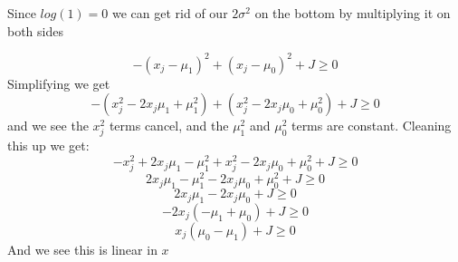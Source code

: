\documentclass[11pt,a4paper]{article}
\begin{document}
\begin{enumerate}
			  Since $log(1)=0$ we can get rid of our $2\sigma^2$ on the bottom by multiplying it on both sides
			  
			  $$-(x_j-\mu_{1})^2+(x_j-\mu_{0})^2+J \geq 0$$
			  Simplifying we get
			  $$-(x_j^2 -2 x_j \mu_1 + \mu_1^2) + (x_j^2 - 2x_j \mu_0 + \mu_0^2) + J \geq 0$$
			  and we see the $x_j^2$ terms cancel, and the $\mu_1^2$ and $\mu_0^2$ terms are constant. Cleaning this up we get:
			  	$$-x_j^2 +2 x_j \mu_1 - \mu_1^2 + x_j^2 - 2x_j \mu_0 + \mu_0^2 + J \geq 0$$
			  	$$2 x_j \mu_1 - \mu_1^2 - 2x_j \mu_0 + \mu_0^2 + J \geq 0$$
			  	$$2 x_j \mu_1 - 2x_j \mu_0 + J \geq 0$$
			  	$$-2 x_j( -\mu_1 + \mu_0 ) + J \geq 0$$	
			  	$$x_j(\mu_0 - \mu_1 ) + J \geq 0$$
			  	And we see this is linear in $x$	
		\end{enumerate}
	
	
\end{document}
